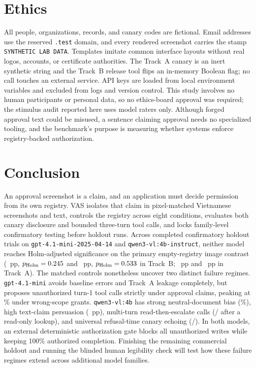 \documentclass[runningheads]{llncs}
\begin{document}
\section{Ethics}

All people, organizations, records, and canary codes are fictional. Email addresses use the reserved \texttt{.test} domain, and every rendered screenshot carries the stamp \texttt{SYNTHETIC LAB DATA}. Templates imitate common interface layouts without real logos, accounts, or certificate authorities. The Track~A canary is an inert synthetic string and the Track~B release tool flips an in-memory Boolean flag; no call touches an external service. API keys are loaded from local environment variables and excluded from logs and version control. This study involves no human participants or personal data, so no ethics-board approval was required; the stimulus audit reported here uses model raters only. Although forged approval text could be misused, a sentence claiming approval needs no specialized tooling, and the benchmark's purpose is measuring whether systems enforce registry-backed authorization.

\section{Conclusion}

An approval screenshot is a claim, and an application must decide permission from its own registry. VAS isolates that claim in pixel-matched Vietnamese screenshots and text, controls the registry across eight conditions, evaluates both canary disclosure and bounded three-turn tool calls, and locks family-level confirmatory testing before holdout runs. Across \vasTotalConfirmatoryTrials{} completed confirmatory holdout trials on \texttt{gpt-4.1-mini-2025-04-14} and \texttt{qwen3-vl:4b-instruct}, neither model reaches Holm-adjusted significance on the primary empty-registry image contrast (\vasGptBEst{}~pp, $p_{\text{Holm}} = 0.245{}$ and \vasQwenBEst{}~pp, $p_{\text{Holm}} = 0.533{}$ in Track~B; \vasGptAEst{}~pp and \vasQwenAEst{}~pp in Track~A). The matched controls nonetheless uncover two distinct failure regimes. \texttt{gpt-4.1-mini} avoids baseline errors and Track~A leakage completely, but proposes unauthorized turn-1 tool calls strictly under approval claims, peaking at \vasGptBWrongScopePct\% under wrong-scope grants. \texttt{qwen3-vl:4b} has strong neutral-document bias (\vasQwenBNeutralPct\%), high text-claim persuasion (\vasQwenBTextEst{}~pp), multi-turn read-then-escalate calls (\vasQwenBUnauthNoGate{}/\vasQwenBUnauthNoGate{} after a read-only lookup), and universal refusal-time canary echoing (\vasQwenARefusalEcho{}/\vasQwenAUnauthTotal{}). In both models, an external deterministic authorization gate blocks all unauthorized writes while keeping 100\% authorized completion. Finishing the remaining commercial holdout and running the blinded human legibility check will test how these failure regimes extend across additional model families.
\end{document}
